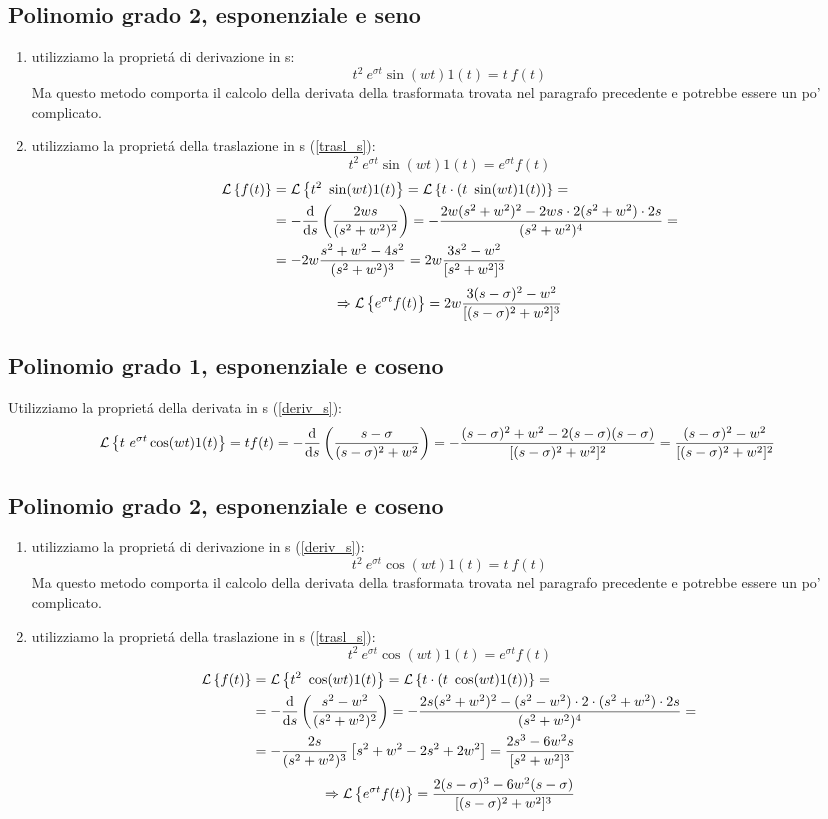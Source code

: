 \documentclass[../main.tex]{subfiles}
\begin{document}
	\subsection{Polinomio grado 2, esponenziale e seno}
	\begin{enumerate}
		\item utilizziamo la propriet\'{a} di derivazione in s:
		$$ t^2\ e^{\sigma t} \sin(wt) 1(t) = t\ f(t) $$
		Ma questo metodo comporta il calcolo della derivata della trasformata trovata nel paragrafo precedente e potrebbe essere un po' complicato.
		\item utilizziamo la propriet\'{a} della traslazione in s (\ref{trasl_s}):
		$$ t^2\ e^{\sigma t} \sin(wt) 1(t) = e^{\sigma t} f(t) $$
		\begin{align*}
		\mathcal{L} \left\lbrace f(t) \right\rbrace &= \mathcal{L} \left\lbrace t^2\ \sin(wt) 1(t) \right\rbrace = \mathcal{L} \left\lbrace t \cdot (t\ \sin(wt) 1(t)) \right\rbrace =\\
		&= -\frac{\mathrm{d} }{\mathrm{d} s} \left( \frac{2ws}{(s^2+w^2)^2} \right) = -\frac{2w(s^2+w^2)^2-2ws \cdot 2(s^2+w^2) \cdot 2s}{(s^2+w^2)^4} =\\ 
		&= -2w \frac{s^2+w^2-4s^2}{(s^2+w^2)^3} = 2w \frac{3s^2-w^2}{[s^2+w^2]^3}
		\end{align*}
		$$ \Rightarrow \mathcal{L} \left\lbrace e^{\sigma t} f(t) \right\rbrace = 2w \frac{3(s-\sigma)^2 - w^2}{[(s-\sigma)^2+w^2]^3} $$
	\end{enumerate}
	\subsection{Polinomio grado 1, esponenziale e coseno}
	Utilizziamo la propriet\'{a} della derivata in s (\ref{deriv_s}):
	$$ \mathcal{L} \left\lbrace t\ e^{\sigma t} \cos(wt) 1(t) \right\rbrace = t f(t) = -\frac{\mathrm{d} }{\mathrm{d} s} \left( \frac{s-\sigma}{(s-\sigma)^2+w^2} \right) = -\frac{(s-\sigma)^2+w^2-2(s-\sigma)(s-\sigma)}{[(s-\sigma)^2+w^2]^2} = \frac{(s-\sigma)^2-w^2}{[(s-\sigma)^2+w^2]^2} $$
	\subsection{Polinomio grado 2, esponenziale e coseno}
	\begin{enumerate}
		\item utilizziamo la propriet\'{a} di derivazione in s (\ref{deriv_s}):
		$$ t^2\ e^{\sigma t} \cos(wt) 1(t) = t\ f(t) $$
		Ma questo metodo comporta il calcolo della derivata della trasformata trovata nel paragrafo precedente e potrebbe essere un po' complicato.
		\item utilizziamo la propriet\'{a} della traslazione in s (\ref{trasl_s}):
		$$ t^2\ e^{\sigma t} \cos(wt) 1(t) = e^{\sigma t} f(t) $$
		\begin{align*}
		\mathcal{L} \left\lbrace f(t) \right\rbrace &= \mathcal{L} \left\lbrace t^2\ \cos(wt) 1(t) \right\rbrace = \mathcal{L} \left\lbrace t \cdot (t\ \cos(wt) 1(t)) \right\rbrace =\\
		&= -\frac{\mathrm{d} }{\mathrm{d} s} \left( \frac{s^2-w^2}{(s^2+w^2)^2} \right) = -\frac{2s(s^2+w^2)^2 - (s^2-w^2) \cdot 2 \cdot (s^2+w^2) \cdot 2s}{(s^2+w^2)^4} =\\ 
		&= -\frac{2s}{(s^2+w^2)^3} \left[ s^2+w^2-2s^2+2w^2 \right] = \frac{2s^3-6w^2s}{[s^2+w^2]^3}
		\end{align*}
		$$ \Rightarrow \mathcal{L} \left\lbrace e^{\sigma t} f(t) \right\rbrace = \frac{2(s-\sigma)^3-6w^2(s-\sigma)}{[(s-\sigma)^2+w^2]^3} $$
	\end{enumerate}
\end{document}
